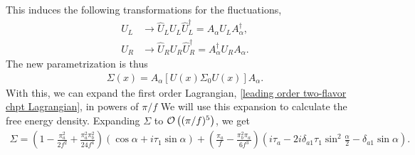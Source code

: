 %
This induces the following transformations for the fluctuations,
\begin{align}
    U_L & \rightarrow \hat U_L U_L \hat U_L^\dagger = A_\alpha U_L A_\alpha^\dagger, \\
    U_R & \rightarrow \hat U_R U_R \hat U_R^\dagger = A_\alpha^\dagger U_R A_\alpha.
\end{align}
%
The new parametrization is thus
\begin{align}
    \label{sigma}
        \Sigma(x) = A_\alpha [U(x) \Sigma_0 U(x)] A_\alpha.
\end{align}
%
With this, we can expand the first order Lagrangian, \autoref{leading order two-flavor chpt Lagrangian}, in powers of $\pi/f$
We will use this expansion to calculate the free energy density.
Expanding $\Sigma$ to $\mathcal O \left((\pi/f)^5\right)$, we get
\begin{align}
    \Sigma =
     \left(
        1 
        - \frac{\pi_a^2}{2f^2}
        + \frac{\pi_a^2\pi_b^2}{24f^4}
    \right)
    (\cos{\alpha} + i \tau_1 \sin{\alpha})
    +
    \left(
        \frac{\pi_a}{f} 
        - \frac{\pi_b^2\pi_a}{6f^3} 
    \right)
    \left(
        i\tau_a - 2i \delta_{a1}\tau_1\sin^2{\frac{\alpha}{2}} - \delta_{a1} \sin{\alpha}
    \right).
    \label{expansion of sigma}
\end{align}
%

